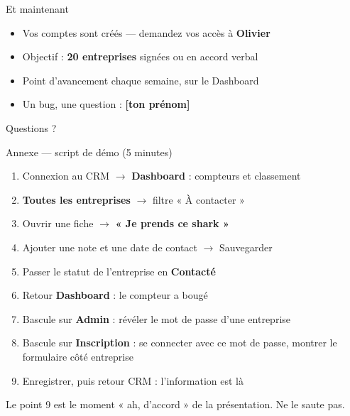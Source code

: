 \documentclass[aspectratio=169,11pt]{beamer}
\newcommand{\cle}[1]{\textbf{\textcolor{noirApp}{#1}}}
\begin{document}
\begin{frame}{Et maintenant}
  \begin{itemize}
    \item Vos comptes sont créés --- demandez vos accès à \cle{Olivier}
    \item Objectif : \cle{20 entreprises} signées ou en accord verbal
    \item Point d'avancement chaque semaine, sur le Dashboard
    \item Un bug, une question : \cle{[ton prénom]}
  \end{itemize}
\end{frame}

\begin{frame}[standout]
  Questions ?
\end{frame}

\appendix

\begin{frame}{Annexe --- script de démo (5 minutes)}
  \footnotesize
  \begin{enumerate}
    \item Connexion au CRM $\rightarrow$ \textbf{Dashboard} : compteurs et
          classement
    \item \textbf{Toutes les entreprises} $\rightarrow$ filtre « À contacter »
    \item Ouvrir une fiche $\rightarrow$ \textbf{« Je prends ce shark »}
    \item Ajouter une note et une date de contact $\rightarrow$ Sauvegarder
    \item Passer le statut de l'entreprise en \textbf{Contacté}
    \item Retour \textbf{Dashboard} : le compteur a bougé
    \item Bascule sur \textbf{Admin} : révéler le mot de passe d'une entreprise
    \item Bascule sur \textbf{Inscription} : se connecter avec ce mot de passe,
          montrer le formulaire côté entreprise
    \item Enregistrer, puis retour CRM : l'information est là
  \end{enumerate}

  \vfill
  \begin{block}{}
    Le point 9 est le moment « ah, d'accord » de la présentation. Ne le saute pas.
  \end{block}
\end{frame}
\end{document}
